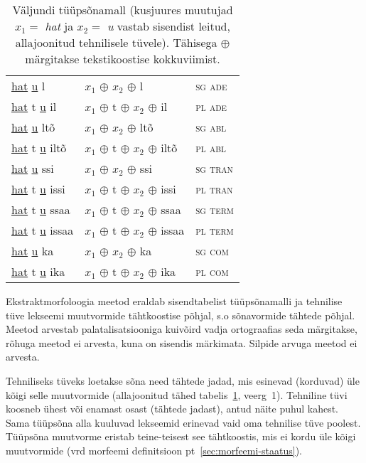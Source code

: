 \documentclass[12pt,a4paper]{article}
\begin{document}
\begin{table}[H]
\begin{minipage}[t]{.55\textwidth}
\begin{tabular}[t]{l l l}
      \underline{hat}   \underline{u} l     & $x_1$ $\oplus$ $x_2$ $\oplus$ l         & \textsc{sg ade} \\
      \underline{hat} t \underline{u} il    & $x_1$ $\oplus$ t $\oplus$ $x_2$ $\oplus$ il    & \textsc{pl ade} \\
      \underline{hat}   \underline{u} ltõ   & $x_1$ $\oplus$ $x_2$ $\oplus$ ltõ       & \textsc{sg abl} \\
      \underline{hat} t \underline{u} iltõ  & $x_1$ $\oplus$ t $\oplus$ $x_2$ $\oplus$ iltõ  & \textsc{pl abl} \\
      \underline{hat}   \underline{u} ssi   & $x_1$ $\oplus$ $x_2$ $\oplus$ ssi       & \textsc{sg tran} \\
      \underline{hat} t \underline{u} issi  & $x_1$ $\oplus$ t $\oplus$ $x_2$ $\oplus$ issi  & \textsc{pl tran} \\
      \underline{hat} t \underline{u} ssaa  & $x_1$ $\oplus$ t $\oplus$ $x_2$ $\oplus$ ssaa  & \textsc{sg term} \\
      \underline{hat} t \underline{u} issaa & $x_1$ $\oplus$ t $\oplus$ $x_2$ $\oplus$ issaa & \textsc{pl term} \\
      \underline{hat}   \underline{u} ka    & $x_1$ $\oplus$ $x_2$ $\oplus$ ka        & \textsc{sg com} \\
      \underline{hat} t \underline{u} ika   & $x_1$ $\oplus$ t $\oplus$ $x_2$ $\oplus$ ika   & \textsc{pl com} \\
    \end{tabular}
    \caption{Väljundi tüüpsõnamall (kus\-juures muutujad $x_1 = $ \textit{hat} ja $x_2 = $ \textit{u} vastab sisendist leitud, allajoonitud tehnilisele tüvele). Tähisega $\oplus$ märgitakse teksti\-koostise kokku\-viimist.}
    \label{tab:väljundtabel-katto}
  \end{minipage}
\end{table}

Ekstraktmorfoloogia meetod eraldab sisendtabelist tüüp\-sõna\-malli ja tehnilise tüve lekseemi muutvormide tähtkoostise põhjal, s.o sõnavormide tähtede põhjal. Meetod arvestab palatalisatsiooniga kuivõird vadja ortograafias seda märgitakse, rõhuga meetod ei arvesta, kuna on sisendis märkimata. Silpide arvuga meetod ei arvesta. %

Tehniliseks tüveks loetakse sõna need tähtede jadad, mis esinevad (korduvad) üle kõigi selle muutvormide (allajoonitud tähed tabelis~\ref{tab:väljundtabel-katto}, veerg~1). Tehniline tüvi koosneb ühest või enamast osast (tähtede jadast), antud näite puhul kahest. Sama tüüpsõna alla kuuluvad lekseemid erinevad vaid oma tehnilise tüve poolest. %
Tüüpsõna muutvorme eristab teine-teisest see tähtkoostis, mis ei kordu üle kõigi muutvormide (vrd morfeemi definitsioon pt~\ref{sec:morfeemi-staatus}).
\end{document}
